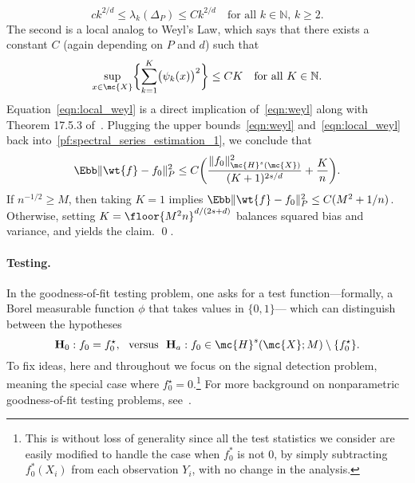 \begin{equation}
\label{eqn:weyl}
ck^{2/d} \leq \lambda_k(\Delta_P) \leq Ck^{2/d}\quad\textrm{for all $k \in \mathbb{N}$, $k \geq 2$}.
\end{equation}
The second is a local analog to Weyl's Law, which says that there exists a constant $C$ (again depending on $P$ and $d$) such that
\begin{equation}
\label{eqn:local_weyl}
\sup_{x \in \mc{X}}\biggl\{\sum_{k = 1}^{K} \bigl(\psi_k(x)\bigr)^2\biggr\} \leq CK \quad\textrm{for all $K \in \mathbb{N}$}.
\end{equation}
Equation~\eqref{eqn:local_weyl} is a direct implication of~\eqref{eqn:weyl} along with Theorem 17.5.3 of~\cite{hormander1973}. Plugging the upper bounds~\eqref{eqn:weyl} and~\eqref{eqn:local_weyl} back into~\eqref{pf:spectral_series_estimation_1}, we conclude that
\begin{equation}
\label{pf:spectral_series_estimation_3}
\Ebb \|\wt{f} - f_0\|_P^2 \leq C\biggl(\frac{\|f_0\|_{\mc{H}^s(\mc{X})}^2}{(K + 1)^{2s/d}} + \frac{K}{n}\biggr).
\end{equation}
If $n^{-1/2} \geq M$, then taking $K = 1$ implies $\Ebb \|\wt{f} - f_0\|_P^2 \leq C(M^2 + 1/n)$. Otherwise, setting $K = \floor{M^2n}^{d/(2s + d)}$ balances squared bias and variance, and yields the claim.
\qed.

\paragraph{Testing.}
In the goodness-of-fit testing problem, one asks for a test function---formally, a Borel measurable function $\phi$ that takes values in $\{0,1\}$--- which can distinguish between the hypotheses
\begin{equation}
\mathbf{H}_0: f_0 = f_0^{\star}, ~~\textrm{versus}~~ \mathbf{H}_a: f_0 \in \mc{H}^{s}(\mc{X};M) \setminus \{f_0^{\star}\}.
\end{equation} 
To fix ideas, here and throughout we focus on the signal detection problem, meaning the special case where $f_0^{\star} = 0$.\footnote{This is without loss of generality since all the test statistics we consider are easily modified to handle the case when $f_0^{\ast}$ is not $0$, by simply subtracting $f_0^{\ast}(X_i)$ from each observation $Y_i$, with no change in the analysis.} For more background on nonparametric goodness-of-fit testing problems, see~\cite{ingster2012}.

